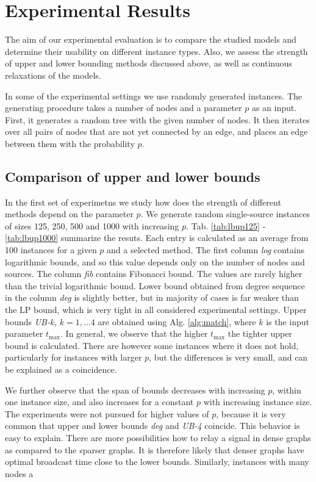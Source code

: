 \section{Experimental Results}

The aim of our experimental evaluation is to compare the studied models and determine their usability on different instance types.
Also, we assess the strength of upper and lower bounding methods discussed above, as well as continuous relaxations of the models.

In some of the experimental settings we use randomly generated instances.
The generating procedure takes a number of nodes and a parameter $p$ as an input.
First, it generates a random tree with the given number of nodes.
It then iterates over all pairs of nodes that are not yet connected by an edge, and places an edge between them with the probability $p$.

\subsection{Comparison of upper and lower bounds}

In the first set of experimetns we study how does the strength of different methods depend on the parameter $p$.
We generate random single-source instances of sizes 125, 250, 500 and 1000 with increasing $p$.
Tab. \ref{tab:lbup125} - \ref{tab:lbup1000} summarize the resuts.
Each entry is calculated as an average from 100 instances for a given $p$ and a selected method.
The first column \emph{log} contains logarithmic bounds, and so this value depends only on the number of nodes and sources.
The column \emph{fib} contains Fibonacci bound.
The values are rarely higher than the trivial logarithmic bound.
Lower bound obtained from degree sequence in the column \emph{deg} is slightly better, 
but in majority of cases is far weaker than the LP bound, which is very tight in all considered experimental settings.
Upper bounds \emph{UB-k, $k=1,\dots 4$} are obtained using Alg. \ref{alg:match}, where $k$ is the input parameter $t_{\text{max}}$.
In general, we observe that the higher $t_{\text{max}}$ the tighter upper bound is calculated.
There are however some instances where it does not hold, particularly for instances with larger $p$,  but the differences is very small, and can be explained as a coincidence.

We further observe that the span of bounds decreases with increasing $p$, within one instance size, and also increases for a constant $p$ with increasing instance size.
The experiments were not pursued for higher values of $p$, because it is very common that upper and lower bounds \emph{deg} and \emph{UB-4} coincide.
This behavior is easy to explain.
There are more possibilities how to relay a signal in dense graphs as compared to the sparser graphs. 
It is therefore likely that denser graphs have optimal broadcast time close to the lower bounds.
Similarly, instances with many nodes a



